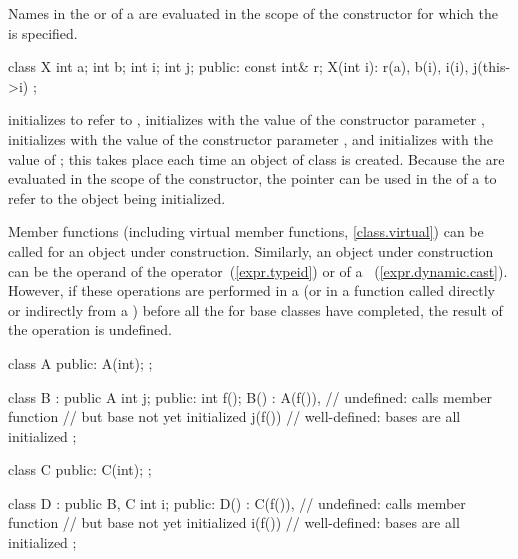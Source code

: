 \pnum
{}%
Names in the
or 
of a
are evaluated in the scope of the constructor for which the
is specified.
\enterexample

\begin{codeblock}
class X {
  int a;
  int b;
  int i;
  int j;
public:
  const int& r;
  X(int i): r(a), b(i), i(i), j(this->i) { }
};
\end{codeblock}

initializes
to refer to
,
initializes
with the value of the constructor parameter
,
initializes
with the value of the constructor parameter
,
and initializes
with the value of
;
this takes place each time an object of class
is created.
\exitexample
\enternote
Because the
are evaluated in the scope of the constructor, the
pointer can be used in the
of a
to refer to the object being initialized.
\exitnote

\pnum
{}%
Member functions (including virtual member functions, \ref{class.virtual}) can be
called for an object under construction.
Similarly, an object under construction can be the operand of the
operator~(\ref{expr.typeid}) or of a
~(\ref{expr.dynamic.cast}).
However, if these operations are performed in a
(or in a function called directly or indirectly from a
)
before all the
for base classes have completed, the result of the operation is undefined.
\enterexample

\begin{codeblock}
class A {
public:
  A(int);
};

class B : public A {
  int j;
public:
  int f();
  B() : A(f()),     // undefined: calls member function
                    // but base  not yet initialized
  j(f()) { }        // well-defined: bases are all initialized
};

class C {
public:
  C(int);
};

class D : public B, C {
  int i;
public:
  D() : C(f()),     // undefined: calls member function
                    // but base  not yet initialized
  i(f()) { }        // well-defined: bases are all initialized
};
\end{codeblock}
\exitexample

